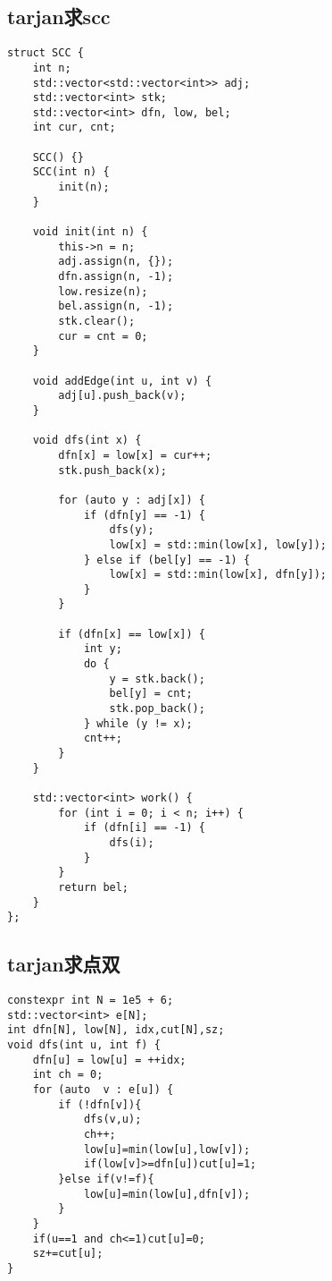 \documentclass[a4paper,10pt]{article}
\begin{document}
\subsection{tarjan求scc}
\thispagestyle{fancy}

\noindent\begin{lstlisting}
struct SCC {
    int n;
    std::vector<std::vector<int>> adj;
    std::vector<int> stk;
    std::vector<int> dfn, low, bel;
    int cur, cnt;

    SCC() {}
    SCC(int n) {
        init(n);
    }

    void init(int n) {
        this->n = n;
        adj.assign(n, {});
        dfn.assign(n, -1);
        low.resize(n);
        bel.assign(n, -1);
        stk.clear();
        cur = cnt = 0;
    }

    void addEdge(int u, int v) {
        adj[u].push_back(v);
    }

    void dfs(int x) {
        dfn[x] = low[x] = cur++;
        stk.push_back(x);

        for (auto y : adj[x]) {
            if (dfn[y] == -1) {
                dfs(y);
                low[x] = std::min(low[x], low[y]);
            } else if (bel[y] == -1) {
                low[x] = std::min(low[x], dfn[y]);
            }
        }

        if (dfn[x] == low[x]) {
            int y;
            do {
                y = stk.back();
                bel[y] = cnt;
                stk.pop_back();
            } while (y != x);
            cnt++;
        }
    }

    std::vector<int> work() {
        for (int i = 0; i < n; i++) {
            if (dfn[i] == -1) {
                dfs(i);
            }
        }
        return bel;
    }
};\end{lstlisting}

\subsection{tarjan求点双}
\thispagestyle{fancy}

\noindent\begin{lstlisting}
constexpr int N = 1e5 + 6;
std::vector<int> e[N];
int dfn[N], low[N], idx,cut[N],sz;
void dfs(int u, int f) {
	dfn[u] = low[u] = ++idx;
	int ch = 0;
	for (auto  v : e[u]) {
		if (!dfn[v]){
			dfs(v,u);
			ch++;
			low[u]=min(low[u],low[v]);
			if(low[v]>=dfn[u])cut[u]=1;
		}else if(v!=f){
			low[u]=min(low[u],dfn[v]);
		}
	}
	if(u==1 and ch<=1)cut[u]=0;
	sz+=cut[u];
}
\end{lstlisting}
\end{document}
